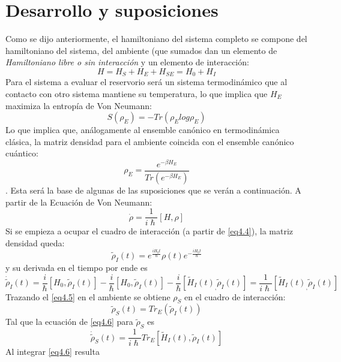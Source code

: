 \documentclass{book}
\begin{document}
\section{Desarrollo y suposiciones}
Como se dijo anteriormente, el hamiltoniano del sistema completo se compone del hamiltoniano del sistema, del ambiente (que sumados dan un elemento de \textit{Hamiltoniano libre o sin interacción} y un elemento de interacción:
\begin{equation}\label{eq4.1}H=H_S+H_E+H_{SE}=H_0+H_I\end{equation}
Para el sistema a evaluar el reservorio será un sistema termodinámico que al contacto con otro sistema mantiene su temperatura, lo que implica que $H_E$ maximiza la entropía de Von Neumann:
\begin{equation}\label{eq4.2}S(\rho_E)=-Tr(\rho_E log \rho_E)\end{equation}
Lo que implica que, análogamente al ensemble canónico en termodinámica clásica, la matriz densidad para el ambiente coincida con el ensemble canónico cuántico:
\begin{equation}\label{eq4.3}\rho_E=\frac{e^{-\beta H_E}}{Tr(e^{-\beta H_E})}\end{equation}.
Esta será la base de algunas de las suposiciones que se verán a continuación. A partir de la Ecuación de Von Neumann:
\begin{equation}\label{eq4.4}\dot{\rho}=\frac{1}{i\hslash}[H,\rho]\end{equation}
Si se empieza a ocupar el cuadro de interacción (a partir de \ref{eq4.4}), la matriz densidad queda:
\begin{equation}\label{eq4.5} \tilde{\rho}_{I}(t)=e^{\frac{iH_0t}{\hslash}}\rho(t)e^{-\frac{iH_0t}{\hslash}}\end{equation}
y su derivada en el tiempo por ende es
\begin{equation}\label{eq4.6} \dot{\tilde{\rho}}_{I}(t)=\frac{i}{\hslash}[H_0,\tilde{\rho}_{I}(t)]-\frac{i}{\hslash}[H_0,\tilde{\rho}_{I}(t)]-\frac{i}{\hslash}[\tilde{H}_I(t)_,\tilde{\rho}_{I}(t)]=\frac{1}{i\hslash}[\tilde{H}_I(t)_,\tilde{\rho}_{I}(t)]\end{equation}
Trazando el \ref{eq4.5} en el ambiente se obtiene $\rho_S$ en el cuadro de interacción:
\begin{equation}\label{eq4.7}\tilde{\rho}_S(t)=Tr_E(\tilde{\rho}_I(t))\end{equation}
Tal que la ecuación de \ref{eq4.6} para $\tilde{\rho}_S$ es
\begin{equation}\label{eq4.8}\dot{\tilde{\rho}}_S(t)=\frac{1}{i\hslash} Tr_E[\tilde{H}_I(t),\tilde{\rho}_I(t)]\end{equation} Al integrar \ref{eq4.6} resulta
\end{document}
